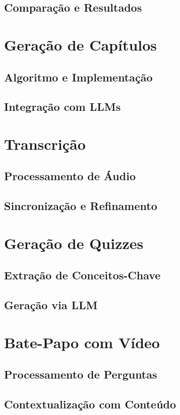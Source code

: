 \documentclass[tcc,capa]{texufpel}
\begin{document}
\subsection{Comparação e Resultados}

\section{Geração de Capítulos}
\subsection{Algoritmo e Implementação}
\subsection{Integração com LLMs}

\section{Transcrição}
\subsection{Processamento de Áudio}
\subsection{Sincronização e Refinamento}

\section{Geração de Quizzes}
\subsection{Extração de Conceitos-Chave}
\subsection{Geração via LLM}

\section{Bate-Papo com Vídeo}
\subsection{Processamento de Perguntas}
\subsection{Contextualização com Conteúdo}
\end{document}
